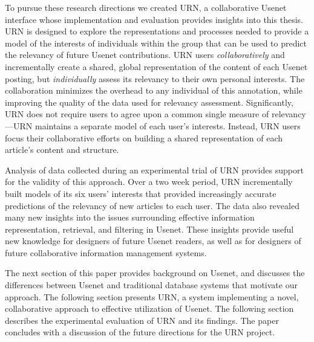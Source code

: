 To pursue these research directions we created URN, a collaborative Usenet
interface whose implementation and evaluation provides insights into this
thesis.  URN is designed to explore the representations and processes needed to
provide a model of the interests of individuals within the group that can be
used to predict the relevancy of future Usenet contributions.  URN users {\em
collaboratively\/} and incrementally create a shared, global representation of
the content of each Usenet posting, but {\em individually\/} assess its
relevancy to their own personal interests.  The collaboration minimizes the
overhead to any individual of this annotation, while improving the quality of
the data used for relevancy assessment.  Significantly, URN does not require
users to agree upon a common single measure of relevancy---URN maintains a
separate model of each user's interests.  Instead, URN users focus their
collaborative efforts on building a shared representation of each article's
content and structure.

Analysis of data collected during an experimental trial of URN provides support
for the validity of this approach.  Over a two week period, URN incrementally
built models of its six users' interests that provided increasingly accurate
predictions of the relevancy of new articles to each user.  The data also
revealed many new insights into the issues surrounding effective information
representation, retrieval, and filtering in Usenet.  These insights provide
useful new knowledge for designers of future Usenet readers, as well as for
designers of future collaborative information management systems.

The next section of this paper provides background on Usenet, and discusses
the differences between Usenet and traditional database systems that
motivate our approach.  The following section presents URN, a system
implementing a novel, collaborative approach to effective utilization of
Usenet.  The following section describes the experimental evaluation of URN
and its findings. The paper concludes with a discussion of the future
directions for the URN project.


